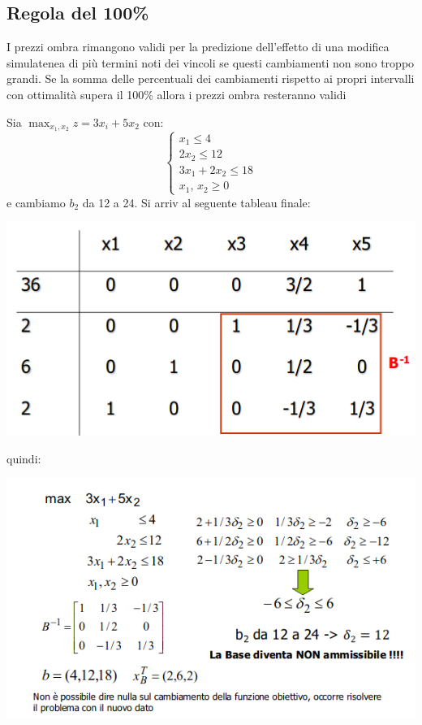 \message{ !name(ro.tex)}\documentclass[a4paper,12pt, oneside]{book}
\begin{document}
\subsection{Regola del 100\%}
\begin{definizione}
  I prezzi ombra rimangono validi per la predizione dell'effetto di
  una modifica simulatenea di più termini noti dei vincoli se questi
  cambiamenti non sono troppo grandi. Se la somma delle percentuali
  dei cambiamenti rispetto ai propri intervalli con ottimalità supera
  il 100\% allora i prezzi ombra resteranno validi
\end{definizione}
\begin{esempio}
  Sia $\max_{x_1,x_2}z=3x_i+5x_2$ con:
  \[
    \begin{cases}
      x_1\leq 4\\
      2x_2\leq 12\\
      3x_1+2x_2\leq 18\\
      x_1,\,x_2\geq 0
    \end{cases}
  \]
  e cambiamo $b_2$ da 12 a 24. Si arriv al seguente tableau finale:
  \begin{center}
    \includegraphics[scale = 0.7]{img/add2.png}
  \end{center}
  quindi:
  \begin{center}
    \includegraphics[scale = 0.7]{img/add3.png}

\end{center}
\end{esempio}
\end{document}
